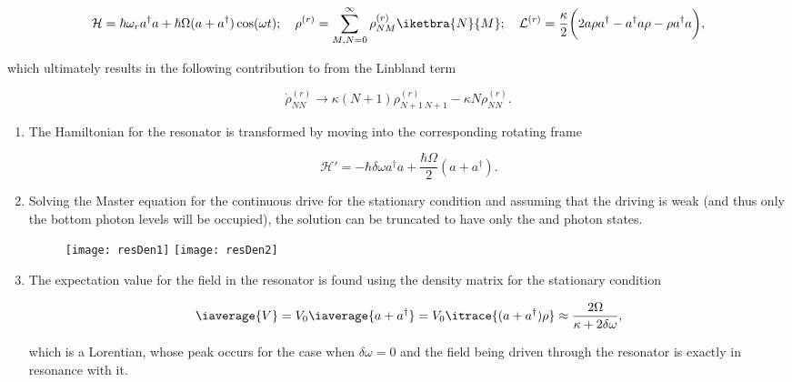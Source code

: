 \begin{equation}\label{ar2}
  \mathcal{H} = \hbar\omega_ra^{\dagger}a+\hbar\Omega(a+a^{\dagger})\cos(\omega t);\quad\rho^{(r)} = \sum_{M,N=0}^{\infty}\rho_{NM}^{(r)}\iketbra{N}{M};\quad \mathcal{L}^{(r)} = \frac{\kappa}{2}\bigg(2a\rho a^{\dagger}-a^{\dagger}a\rho-\rho a^{\dagger}a\bigg),
\end{equation}

\noindent  which  ultimately results  in  the
following contribution  to from  the Linbland
term

\begin{equation}\label{ar3}
  \dot{\rho}_{NN}^{(r)} \rightarrow \kappa(N+1)\rho_{N+1\ N+1}^{(r)} - \kappa N \rho_{NN}^{(r)}.
\end{equation}


\begin{enumerate}
\item  The Hamiltonian  for the  resonator is
  transformed    by     moving    into    the
  corresponding rotating frame

  \begin{equation}\label{ar4}
    \mathcal{H'} = -\hbar\delta\omega a^{\dagger}a+\frac{\hbar\Omega}{2}(a+a^{\dagger}).
  \end{equation}

\item  Solving the  Master  equation for  the
  continuous   drive   for   the   stationary
  condition and assuming  that the driving is
  weak  (and  thus  only  the  bottom  photon
  levels will be  occupied), the solution can
  be truncated to have  only the  and
   photon states.

  \begin{figure}[h]
    \texttt{[image: resDen1]}
    \texttt{[image: resDen2]}
  \end{figure}

\item The expectation value  for the field in
  the  resonator is  found using  the density
  matrix for the stationary condition

  \begin{equation}\label{filedRes}
    \iaverage{V} = V_0\iaverage{a+a^{\dagger}} = V_0\itrace{(a+a^{\dagger})\rho}\approx\frac{2\Omega}{\kappa+2\delta\omega},
  \end{equation}

  \noindent which is  a Lorentian, whose peak
  occurs for the case when $ \delta\omega=0 $
  and  the  field  being driven  through  the
  resonator is exactly in resonance with it.
\end{enumerate}


